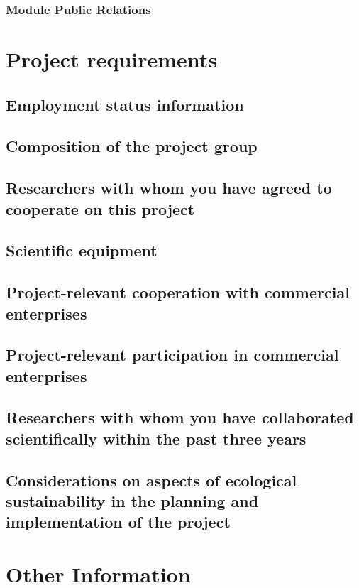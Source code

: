 \documentclass{scrartcl}
\begin{document}
\subsubsection{Module Public Relations}


\section{Project requirements}

\subsection{Employment status information}

\subsection{Composition of the project group}

\subsection{Researchers with whom you have agreed to cooperate on this project}

\subsection{Scientific equipment}

\subsection{Project-relevant cooperation with commercial enterprises}

\subsection{Project-relevant participation in commercial enterprises}

\subsection{Researchers with whom you have collaborated scientifically within the past three years}

\subsection{Considerations on aspects of ecological sustainability in the planning and implementation of the project}


\section{Other Information}
\end{document}
